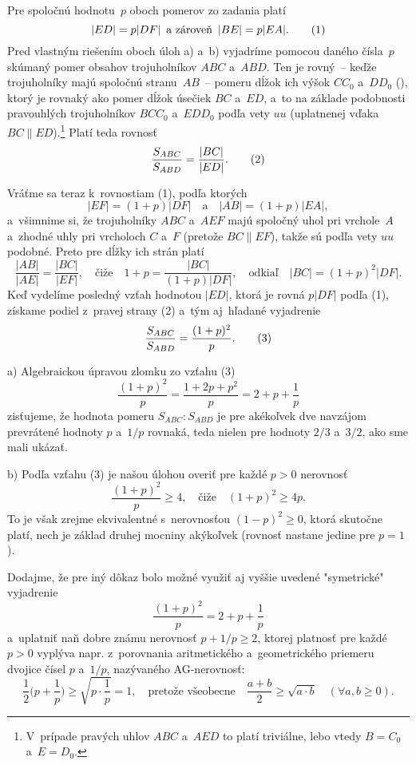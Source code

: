{%
Pre spoločnú hodnotu~$p$ oboch pomerov zo zadania platí
$$
|ED|=p|DF|\quad\text{a~zároveň}\quad|BE|=p|EA|. \tag1
$$
Pred vlastným riešením oboch úloh a) a~b) vyjadríme pomocou daného
čísla~$p$ skúmaný pomer obsahov trojuholníkov $ABC$ a~$ABD$.
Ten je rovný~-- keďže trojuholníky majú spoločnú stranu~$AB$~--
pomeru dĺžok ich výšok $CC_0$ a~$DD_0$ (\obr), ktorý je
%
rovnaký ako pomer dĺžok úsečiek $BC$ a~$ED$,
a~to na základe podobnosti pravouhlých trojuholníkov $BCC_0$ a~$EDD_0$ podľa vety
$uu$ (uplatnenej vďaka $BC\parallel ED$).\footnote{V~prípade pravých uhlov $ABC$ a~$AED$ to platí
triviálne, lebo vtedy $B=C_0$ a~$E=D_0$.} Platí teda rovnosť
$$
\frac{S_{ABC}}{S_{ABD}}=\frac{|BC|}{|ED|}.
\tag2
$$

Vráťme sa teraz k~rovnostiam (1), podľa ktorých
$$
|EF|=(1+p)|DF|\quad\text{a}\quad|AB|=(1+p)|EA|,
$$
a~všimnime si, že trojuholníky $ABC$ a~$AEF$ majú spoločný uhol pri vrchole~$A$
a~zhodné uhly pri vrcholoch $C$ a~$F$ (pretože $BC\parallel EF$), takže
sú podľa vety $uu$ podobné. Preto pre dĺžky ich strán platí
$$
\frac{|AB|}{|AE|}=\frac{|BC|}{|EF|},\quad\text{čiže}\quad
1+p=\frac{|BC|}{(1+p)|DF|},\quad\text{odkiaľ}\quad
|BC|=(1+p)^2|DF|.
$$
Keď vydelíme posledný vzťah hodnotou $|ED|$, ktorá je rovná $p|DF|$ podľa
(1), získame podiel z~pravej strany (2) a~tým aj~hľadané vyjadrenie
$$
\frac{S_{ABC}}{S_{ABD}}=\frac{(1+p)^2}{p}.
\tag3$$

\smallskip
a) Algebraickou úpravou zlomku zo vzťahu (3)
$$
\frac{(1+p)^2}{p}=\frac{1+2p+p^2}{p}=2+p+\frac{1}{p}
$$
zisťujeme, že hodnota pomeru $S_{ABC}:S_{ABD}$ je pre akékoľvek dve
navzájom prevrátené hodnoty $p$ a~$1/p$ rovnaká, teda nielen pre
hodnoty $2/3$ a~$3/2$, ako sme mali ukázať.

\smallskip
b) Podľa vzťahu (3) je našou úlohou overiť pre každé $p>0$
nerovnosť
$$
\frac{(1+p)^2}{p}\ge4,\quad\text{čiže}\quad
(1+p)^2\ge4p.
$$
To je však zrejme ekvivalentné s~nerovnosťou $(1-p)^2\ge0$,
ktorá skutočne platí, nech je základ druhej mocniny akýkoľvek
(rovnosť nastane jedine pre $p=1$).

Dodajme,
že pre iný dôkaz bolo možné využiť aj vyššie uvedené "symetrické" vyjadrenie
$$
\frac{(1+p)^2}{p}=2+p+\frac{1}{p}
$$
a~uplatniť naň dobre známu nerovnosť $p+1/p\ge2$, ktorej
platnosť pre každé $p>0$ vyplýva napr. z~porovnania aritmetického
a~geometrického priemeru dvojice čísel $p$ a~$1/p$, nazývaného
AG-nerovnosť:
$$
\frac1{2}\Big(p+\frac{1}{p}\Big)\ge\sqrt{p\cdot\frac{1}{p}}=1,
\quad\text{pretože všeobecne}\quad\frac{a+b}{2}\ge\sqrt{a\cdot b}\quad
(\forall a,b\ge0).
$$


}
